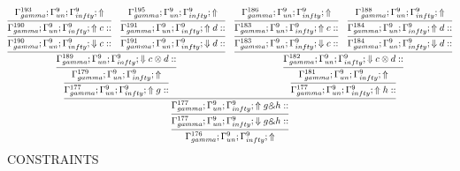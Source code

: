 \documentclass[a4paper, 11pt]{article}
\begin{document}
{\small
\[
\infer{\Gamma_{ gamma}^{176} ; \Gamma_{un}^{9} ; \Gamma_{ infty}^{9} ;  \Uparrow }
{\infer{\Gamma_{ gamma}^{177} ; \Gamma_{un}^{9} ; \Gamma_{ infty}^{9} ;  \Downarrow g \binampersand h :: }
{\infer{\Gamma_{ gamma}^{177} ; \Gamma_{un}^{9} ; \Gamma_{ infty}^{9} ;  \Uparrow g \binampersand h :: }
{\infer{\Gamma_{ gamma}^{177} ; \Gamma_{un}^{9} ; \Gamma_{ infty}^{9} ;  \Uparrow g :: }
{\infer{\Gamma_{ gamma}^{179} ; \Gamma_{un}^{9} ; \Gamma_{ infty}^{9} ;  \Uparrow }
{\infer{\Gamma_{ gamma}^{189} ; \Gamma_{un}^{9} ; \Gamma_{ infty}^{9} ;  \Downarrow c \otimes d :: }
{\infer{\Gamma_{ gamma}^{190} ; \Gamma_{un}^{9} ; \Gamma_{ infty}^{9} ;  \Downarrow c :: }
{\infer{\Gamma_{ gamma}^{190} ; \Gamma_{un}^{9} ; \Gamma_{ infty}^{9} ;  \Uparrow c :: }
{\Gamma_{ gamma}^{193} ; \Gamma_{un}^{9} ; \Gamma_{ infty}^{9} ;  \Uparrow }}
&
\infer{\Gamma_{ gamma}^{191} ; \Gamma_{un}^{9} ; \Gamma_{ infty}^{9} ;  \Downarrow d :: }
{\infer{\Gamma_{ gamma}^{191} ; \Gamma_{un}^{9} ; \Gamma_{ infty}^{9} ;  \Uparrow d :: }
{\Gamma_{ gamma}^{195} ; \Gamma_{un}^{9} ; \Gamma_{ infty}^{9} ;  \Uparrow }}}}}
&
\infer{\Gamma_{ gamma}^{177} ; \Gamma_{un}^{9} ; \Gamma_{ infty}^{9} ;  \Uparrow h :: }
{\infer{\Gamma_{ gamma}^{181} ; \Gamma_{un}^{9} ; \Gamma_{ infty}^{9} ;  \Uparrow }
{\infer{\Gamma_{ gamma}^{182} ; \Gamma_{un}^{9} ; \Gamma_{ infty}^{9} ;  \Downarrow c \otimes d :: }
{\infer{\Gamma_{ gamma}^{183} ; \Gamma_{un}^{9} ; \Gamma_{ infty}^{9} ;  \Downarrow c :: }
{\infer{\Gamma_{ gamma}^{183} ; \Gamma_{un}^{9} ; \Gamma_{ infty}^{9} ;  \Uparrow c :: }
{\Gamma_{ gamma}^{186} ; \Gamma_{un}^{9} ; \Gamma_{ infty}^{9} ;  \Uparrow }}
&
\infer{\Gamma_{ gamma}^{184} ; \Gamma_{un}^{9} ; \Gamma_{ infty}^{9} ;  \Downarrow d :: }
{\infer{\Gamma_{ gamma}^{184} ; \Gamma_{un}^{9} ; \Gamma_{ infty}^{9} ;  \Uparrow d :: }
{\Gamma_{ gamma}^{188} ; \Gamma_{un}^{9} ; \Gamma_{ infty}^{9} ;  \Uparrow }}}}}}}}
\]
}
CONSTRAINTS
\end{document}
